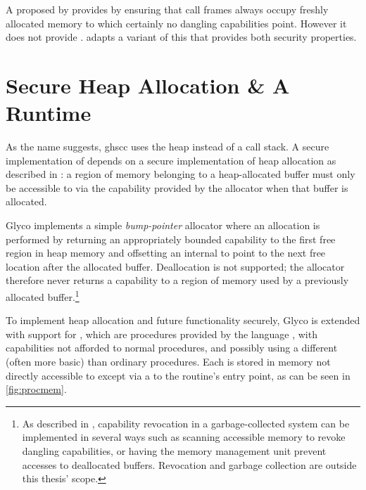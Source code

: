 \documentclass[main.tex]{subfiles}
\begin{document}
A  proposed by \cite[section~7.3]{cerise} provides  by ensuring that call frames always occupy freshly allocated memory to which certainly no dangling capabilities point. However it does not provide .  adapts a variant of this  that provides both security properties.

\section{Secure Heap Allocation \& A Runtime} \label{sct:ghscc-rt}
As the name suggests, \acrlong{ghscc} uses the heap instead of a call stack. A secure implementation of  depends on a secure implementation of heap allocation as described in \cite[section~7.1]{cerise}: a region of memory belonging to a heap-allocated buffer must only be accessible to  via the capability provided by the allocator when that buffer is allocated.

Glyco implements a simple \emph{bump-pointer} allocator where an allocation is performed by returning an appropriately bounded capability to the first free region in heap memory and offsetting an internal \textbf{} to point to the next free location after the allocated buffer. Deallocation is not supported; the allocator therefore never returns a capability to a region of memory used by a previously allocated buffer.\footnote{As described in \cite[section~2.3.16]{cheri}, capability revocation in a garbage-collected system can be implemented in several ways such as scanning accessible memory to revoke dangling capabilities, or having the memory management unit prevent accesses to deallocated buffers. Revocation and garbage collection are outside this thesis' scope.}

To implement heap allocation and future functionality securely, Glyco is extended with support for , which are procedures provided by the language , with capabilities not afforded to normal procedures, and possibly using a different (often more basic)  than ordinary procedures. Each  is stored in memory not directly accessible to  except via a  to the routine's entry point, as can be seen in \cref{fig:procmem}.
\end{document}
